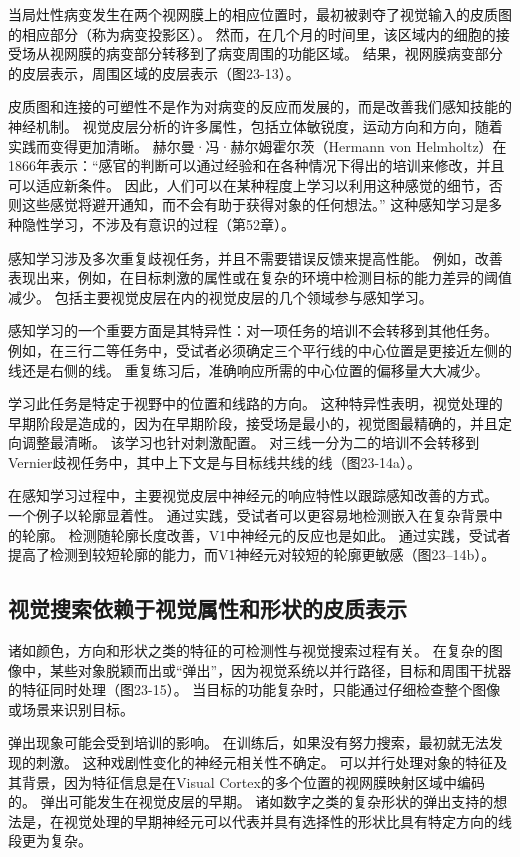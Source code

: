 当局灶性病变发生在两个视网膜上的相应位置时，最初被剥夺了视觉输入的皮质图的相应部分（称为病变投影区）。 然而，在几个月的时间里，该区域内的细胞的接受场从视网膜的病变部分转移到了病变周围的功能区域。 结果，视网膜病变部分的皮层表示，周围区域的皮层表示（图23-13）。

皮质图和连接的可塑性不是作为对病变的反应而发展的，而是改善我们感知技能的神经机制。 视觉皮层分析的许多属性，包括立体敏锐度，运动方向和方向，随着实践而变得更加清晰。 赫尔曼·冯·赫尔姆霍尔茨（Hermann von Helmholtz）在1866年表示：“感官的判断可以通过经验和在各种情况下得出的培训来修改，并且可以适应新条件。 因此，人们可以在某种程度上学习以利用这种感觉的细节，否则这些感觉将避开通知，而不会有助于获得对象的任何想法。” 这种感知学习是多种隐性学习，不涉及有意识的过程（第52章）。

感知学习涉及多次重复歧视任务，并且不需要错误反馈来提高性能。 例如，改善表现出来，例如，在目标刺激的属性或在复杂的环境中检测目标的能力差异的阈值减少。 包括主要视觉皮层在内的视觉皮层的几个领域参与感知学习。

感知学习的一个重要方面是其特异性：对一项任务的培训不会转移到其他任务。 例如，在三行二等任务中，受试者必须确定三个平行线的中心位置是更接近左侧的线还是右侧的线。 重复练习后，准确响应所需的中心位置的偏移量大大减少。

学习此任务是特定于视野中的位置和线路的方向。 这种特异性表明，视觉处理的早期阶段是造成的，因为在早期阶段，接受场是最小的，视觉图最精确的，并且定向调整最清晰。 该学习也针对刺激配置。 对三线一分为二的培训不会转移到Vernier歧视任务中，其中上下文是与目标线共线的线（图23-14a）。

在感知学习过程中，主要视觉皮层中神经元的响应特性以跟踪感知改善的方式。 一个例子以轮廓显着性。 通过实践，受试者可以更容易地检测嵌入在复杂背景中的轮廓。 检测随轮廓长度改善，V1中神经元的反应也是如此。 通过实践，受试者提高了检测到较短轮廓的能力，而V1神经元对较短的轮廓更敏感（图23–14b）。

\subsection{视觉搜索依赖于视觉属性和形状的皮质表示}
诸如颜色，方向和形状之类的特征的可检测性与视觉搜索过程有关。 在复杂的图像中，某些对象脱颖而出或“弹出”，因为视觉系统以并行路径，目标和周围干扰器的特征同时处理（图23-15）。 当目标的功能复杂时，只能通过仔细检查整个图像或场景来识别目标。

弹出现象可能会受到培训的影响。 在训练后，如果没有努力搜索，最初就无法发现的刺激。 这种戏剧性变化的神经元相关性不确定。 可以并行处理对象的特征及其背景，因为特征信息是在Visual Cortex的多个位置的视网膜映射区域中编码的。 弹出可能发生在视觉皮层的早期。 诸如数字之类的复杂形状的弹出支持的想法是，在视觉处理的早期神经元可以代表并具有选择性的形状比具有特定方向的线段更为复杂。


